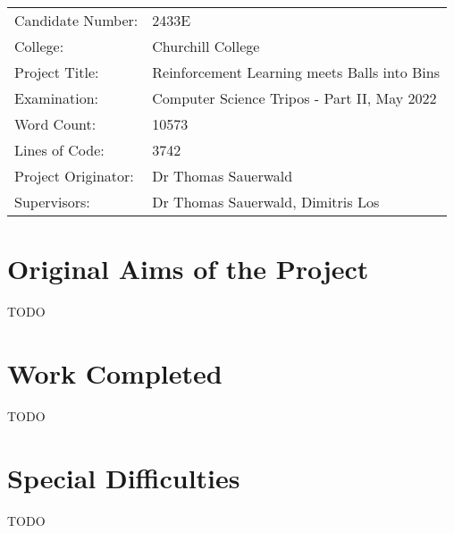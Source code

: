 
\begin{proforma}      


\begin{table}[h]
\begin{tabular}{ll}
Candidate Number:  & 2433E \\
College: & Churchill College \\
Project Title:    &  Reinforcement Learning meets Balls into Bins  \\
Examination:  & Computer Science Tripos - Part II, May 2022   \\
Word Count:  & 10573 \\
Lines of Code: & 3742 \\
Project Originator: & Dr Thomas Sauerwald \\
Supervisors: & Dr Thomas Sauerwald, Dimitris Los 
\end{tabular}
\end{table}


\section*{Original Aims of the Project}

TODO

\section*{Work Completed}

TODO

\section*{Special Difficulties}

TODO



\end{proforma}
